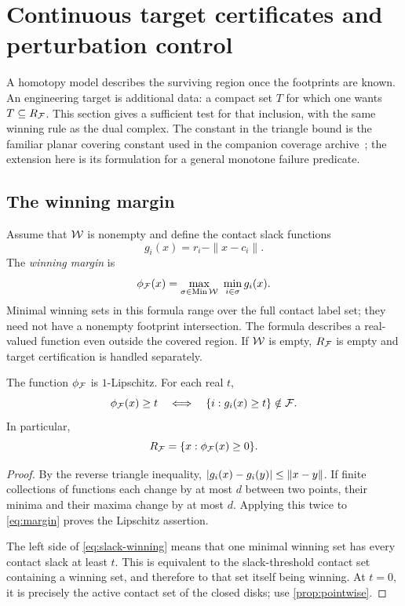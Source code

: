 \section{Continuous target certificates and perturbation control}
\label{sec:certificates}
A homotopy model describes the surviving region once the footprints are known. An engineering target is additional data: a compact set $T$ for which one wants $T\subseteq R_{\mathcal F}$. This section gives a sufficient test for that inclusion, with the same winning rule as the dual complex. The constant in the triangle bound is the familiar planar covering constant used in the companion coverage archive~\cite{ecog}; the extension here is its formulation for a general monotone failure predicate.

\subsection{The winning margin}
Assume that $\mathcal W$ is nonempty and define the contact slack functions
\[
g_i(x)=r_i-\|x-c_i\|.
\]
The \emph{winning margin} is
\begin{equation}\label{eq:margin}
\phi_{\mathcal F}(x)=\max_{\sigma\in\operatorname{Min}\mathcal W}\ \min_{i\in\sigma}g_i(x).
\end{equation}
Minimal winning sets in this formula range over the full contact label set; they need not have a nonempty footprint intersection. The formula describes a real-valued function even outside the covered region. If $\mathcal W$ is empty, $R_{\mathcal F}$ is empty and target certification is handled separately.

\begin{lemma}\label{lem:margin}
The function $\phi_{\mathcal F}$ is $1$-Lipschitz. For each real $t$,
\begin{equation}\label{eq:slack-winning}
\phi_{\mathcal F}(x)\ge t\quad\Longleftrightarrow\quad
\{i:g_i(x)\ge t\}\notin\mathcal F.
\end{equation}
In particular,
\begin{equation}\label{eq:margin-region}
R_{\mathcal F}=\{x:\phi_{\mathcal F}(x)\ge0\}.
\end{equation}
\end{lemma}
\begin{proof}
By the reverse triangle inequality, $\left|g_i(x)-g_i(y)\right|\le\|x-y\|$. If finite collections of functions each change by at most $d$ between two points, their minima and their maxima change by at most $d$. Applying this twice to \cref{eq:margin} proves the Lipschitz assertion.

The left side of \cref{eq:slack-winning} means that one minimal winning set has every contact slack at least $t$. This is equivalent to the slack-threshold contact set containing a winning set, and therefore to that set itself being winning. At $t=0$, it is precisely the active contact set of the closed disks; use \cref{prop:pointwise}.
\end{proof}

